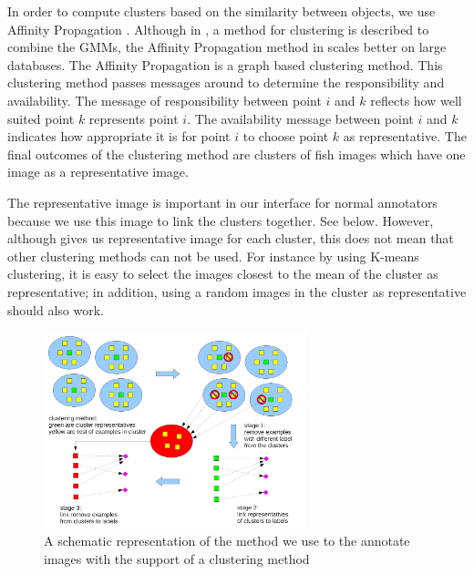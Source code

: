In order to compute clusters based on the similarity between objects, we use Affinity Propagation \cite{frey_clustering_2007}. 
Although in \cite{goldberger_unsupervised_2006}, a method for clustering is described to combine the GMMs, 
the Affinity Propagation method in \cite{frey_clustering_2007} scales better on large databases.
The Affinity Propagation is a graph based clustering method. %
This clustering method passes
messages around to determine the responsibility and availability. The message of responsibility between point
$i$ and $k$ reflects how well suited point $k$ represents point $i$. The availability message between point
$i$ and $k$ indicates how appropriate it is for point $i$ to choose point $k$ as representative. The final 
outcomes of the clustering method are clusters of fish images which have one image as a representative 
image.

The representative image is important in our interface for normal annotators because we use this image to link 
the clusters together. See below.
However, although \cite{frey_clustering_2007} gives us representative image
for each cluster, this does not mean that other clustering methods can not be used. For instance by using K-means
clustering, it is easy to select the images closest to the mean of the cluster as representative; 
in addition, using a random images in the cluster as representative should also work. 

\begin{figure}
\begin{center}
\includegraphics[width=3in]{schematicfigureclusteringmethod}
\caption{A schematic representation of the method we use to the annotate images with the support of a clustering method}
\label{fig:scheme}
\end{center}
\end{figure}

